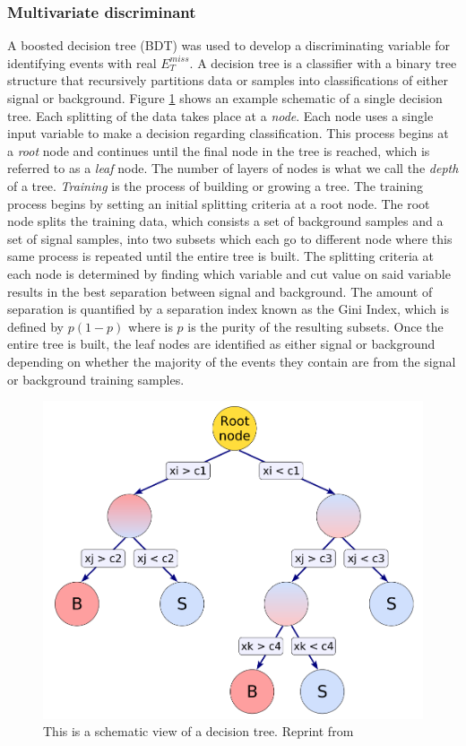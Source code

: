 \subsubsection{Multivariate discriminant}
A boosted decision tree (BDT) was used to develop a discriminating variable for identifying events with real $E^{miss}_T$.  A decision tree is a classifier with a binary tree structure that recursively partitions data or samples into classifications of either signal or background.  Figure \ref{fig:decisiontree} shows an example schematic of a single decision tree.  Each splitting of the data takes place at a \textit{node}.  Each node uses a single input variable to make a decision regarding classification.  This process begins at a \textit{root} node and continues until the final node in the tree is reached, which is referred to as a \textit{leaf} node.  The number of layers of nodes is what we call the \textit{depth} of a tree.  \textit{Training} is the process of building or growing a tree.  The training process begins by setting an initial splitting criteria at a root node.  The root node splits the training data, which consists a set of background samples and a set of signal samples, into two subsets which each go to different node where this same process is repeated until the entire tree is built.  The splitting criteria at each node is determined by finding which variable and cut value on said variable results in the best separation between signal and background.  The amount of separation is quantified by a separation index known as the Gini Index, which is defined by $p(1-p)$ where is $p$ is the purity of the resulting subsets.  Once the entire tree is built, the leaf nodes are identified as either signal or background depending on whether the majority of the events they contain are from the signal or background training samples.
\begin{figure}[h]
	\centering
	\includegraphics[width=1.0\linewidth]{Figures/decisiontree}
	\caption[Schematic view of a decision tree.]{This is a schematic view of a decision tree. Reprint from \cite{Hocker:2007ht}}
	\label{fig:decisiontree}
\end{figure}

